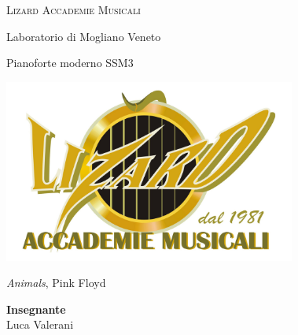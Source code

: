 \documentclass[class=book, crop=false, oneside, a4paper]{standalone}
\begin{document}
    \thispagestyle{empty}
    
    \clearpage
    \thispagestyle{empty}
    \clearpage
    \addtocounter{page}{-2}

    \begin{titlepage}
        \begin{center}
                
            \Huge
            \textsc{Lizard Accademie Musicali}
            
            \vspace{0.5cm}
            \LARGE
            Laboratorio di Mogliano Veneto
            
            \vspace{0.5cm}
            \large
            Pianoforte moderno SSM3
            
            \vspace{1cm}
            
            \includegraphics[width=0.72\textwidth,keepaspectratio]{logo-lizard1.jpg}   
            
            
            
            \vspace{0.5cm}
            
            \Huge{\emph{Animals}, Pink Floyd}
            
            \vspace{0.5cm}
            
            
        \end{center}  
        
        \raggedright
        
        \Large
        \textbf{Insegnante}
        \vspace{0.125cm}\\
        \large
        Luca Valerani

        \vspace{0.2cm}


\end{titlepage}
\end{document}
